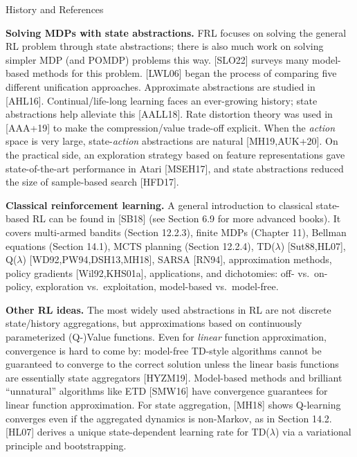 \documentclass[aspectratio=169,10pt]{beamer}
\begin{document}
\begin{frame}[allowframebreaks]{History and References}
  \framebreak

  \textbf{Solving MDPs with state abstractions.} FRL focuses on solving
  the general RL problem through state abstractions; there is also much
  work on solving simpler MDP (and POMDP) problems this way. [SLO22]
  surveys many model-based methods for this problem. [LWL06] began the
  process of comparing five different unification approaches. Approximate
  abstractions are studied in [AHL16]. Continual/life-long learning faces
  an ever-growing history; state abstractions help alleviate this
  [AALL18]. Rate distortion theory was used in [AAA+19] to make the
  compression/value trade-off explicit. When the \emph{action} space is
  very large, state-\emph{action} abstractions are natural [MH19,AUK+20].
  On the practical side, an exploration strategy based on feature
  representations gave state-of-the-art performance in Atari [MSEH17],
  and state abstractions reduced the size of sample-based search
  [HFD17].

  \framebreak

  \textbf{Classical reinforcement learning.} A general introduction to
  classical state-based RL can be found in [SB18] (see Section 6.9 for
  more advanced books). It covers multi-armed bandits (Section 12.2.3),
  finite MDPs (Chapter 11), Bellman equations (Section 14.1), MCTS
  planning (Section 12.2.4), TD($\lambda$) [Sut88,HL07], Q($\lambda$)
  [WD92,PW94,DSH13,MH18], SARSA [RN94], approximation methods, policy
  gradients [Wil92,KHS01a], applications, and dichotomies: off- vs.\
  on-policy, exploration vs.\ exploitation, model-based vs.\ model-free.

  \vspace{0.4em}
  \textbf{Other RL ideas.} The most widely used abstractions in RL are not
  discrete state/history aggregations, but approximations based on
  continuously parameterized (Q-)Value functions. Even for \emph{linear}
  function approximation, convergence is hard to come by: model-free
  TD-style algorithms cannot be guaranteed to converge to the correct
  solution unless the linear basis functions are essentially state
  aggregators [HYZM19]. Model-based methods and brilliant ``unnatural''
  algorithms like ETD [SMW16] have convergence guarantees for linear
  function approximation. For state aggregation, [MH18] shows Q-learning
  converges even if the aggregated dynamics is non-Markov, as in Section
  14.2. [HL07] derives a unique state-dependent learning rate for
  TD($\lambda$) via a variational principle and bootstrapping.


\end{frame}
\end{document}

